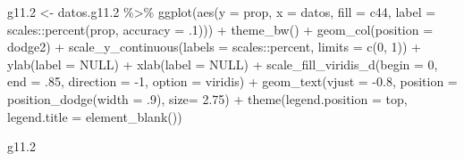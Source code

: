 \documentclass[
  12pt,
]{book}
\newenvironment{Shaded}{\begin{snugshade}}{\end{snugshade}}
\newcommand{\AttributeTok}[1]{\textcolor[rgb]{0.77,0.63,0.00}{#1}}
\newcommand{\ConstantTok}[1]{\textcolor[rgb]{0.00,0.00,0.00}{#1}}
\newcommand{\DecValTok}[1]{\textcolor[rgb]{0.00,0.00,0.81}{#1}}
\newcommand{\FloatTok}[1]{\textcolor[rgb]{0.00,0.00,0.81}{#1}}
\newcommand{\FunctionTok}[1]{\textcolor[rgb]{0.00,0.00,0.00}{#1}}
\newcommand{\NormalTok}[1]{#1}
\newcommand{\OtherTok}[1]{\textcolor[rgb]{0.56,0.35,0.01}{#1}}
\newcommand{\SpecialCharTok}[1]{\textcolor[rgb]{0.00,0.00,0.00}{#1}}
\newcommand{\StringTok}[1]{\textcolor[rgb]{0.31,0.60,0.02}{#1}}
\begin{document}
\begin{Shaded}
\begin{Highlighting}[]
\NormalTok{g11}\FloatTok{.2} \OtherTok{\textless{}{-}}\NormalTok{ datos.g11}\FloatTok{.2} \SpecialCharTok{\%\textgreater{}\%} 
  \FunctionTok{ggplot}\NormalTok{(}\FunctionTok{aes}\NormalTok{(}\AttributeTok{y =}\NormalTok{ prop, }\AttributeTok{x =}\NormalTok{ datos, }\AttributeTok{fill =}\NormalTok{ c44, }
             \AttributeTok{label =}\NormalTok{ scales}\SpecialCharTok{::}\FunctionTok{percent}\NormalTok{(prop, }\AttributeTok{accuracy =}\NormalTok{ .}\DecValTok{1}\NormalTok{))) }\SpecialCharTok{+}
  \FunctionTok{theme\_bw}\NormalTok{() }\SpecialCharTok{+} 
  \FunctionTok{geom\_col}\NormalTok{(}\AttributeTok{position =} \StringTok{\textquotesingle{}dodge2\textquotesingle{}}\NormalTok{) }\SpecialCharTok{+}
  \FunctionTok{scale\_y\_continuous}\NormalTok{(}\AttributeTok{labels =}\NormalTok{ scales}\SpecialCharTok{::}\NormalTok{percent,}
                     \AttributeTok{limits =} \FunctionTok{c}\NormalTok{(}\DecValTok{0}\NormalTok{, }\DecValTok{1}\NormalTok{)) }\SpecialCharTok{+}
  \FunctionTok{ylab}\NormalTok{(}\AttributeTok{label =} \ConstantTok{NULL}\NormalTok{) }\SpecialCharTok{+}
  \FunctionTok{xlab}\NormalTok{(}\AttributeTok{label =} \ConstantTok{NULL}\NormalTok{) }\SpecialCharTok{+}
  \FunctionTok{scale\_fill\_viridis\_d}\NormalTok{(}\AttributeTok{begin =} \DecValTok{0}\NormalTok{, }\AttributeTok{end =}\NormalTok{ .}\DecValTok{85}\NormalTok{, }\AttributeTok{direction =} \SpecialCharTok{{-}}\DecValTok{1}\NormalTok{, }\AttributeTok{option =} \StringTok{\textquotesingle{}viridis\textquotesingle{}}\NormalTok{) }\SpecialCharTok{+}
  \FunctionTok{geom\_text}\NormalTok{(}\AttributeTok{vjust =} \SpecialCharTok{{-}}\FloatTok{0.8}\NormalTok{,}
            \AttributeTok{position =} \FunctionTok{position\_dodge}\NormalTok{(}\AttributeTok{width =}\NormalTok{ .}\DecValTok{9}\NormalTok{),}
            \AttributeTok{size=} \FloatTok{2.75}\NormalTok{)  }\SpecialCharTok{+} 
  \FunctionTok{theme}\NormalTok{(}\AttributeTok{legend.position =} \StringTok{\textquotesingle{}top\textquotesingle{}}\NormalTok{,}
        \AttributeTok{legend.title =} \FunctionTok{element\_blank}\NormalTok{())}

\NormalTok{g11}\FloatTok{.2}
\end{Highlighting}
\end{Shaded}
\end{document}
